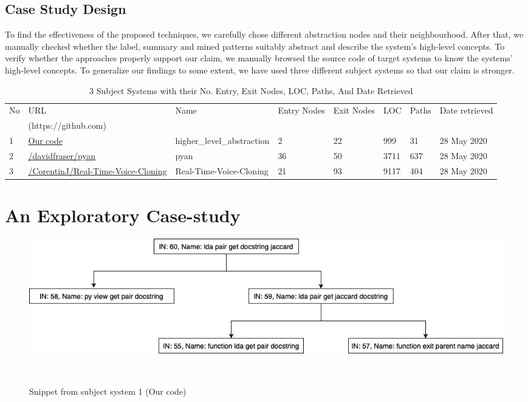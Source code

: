\subsection{Case Study Design}
To find the effectiveness of the proposed techniques, we carefully chose different abstraction nodes and their neighbourhood. After that, we manually checked whether the label, summary and mined patterns suitably abstract and describe the system's high-level concepts. To verify whether the approaches properly support our claim, we manually browsed the source code of target systems to know the systems' high-level concepts. To generalize our findings to some extent, we have used three different subject systems so that our claim is stronger.

\begin{table}%
 \caption{3 Subject Systems with their No. Entry, Exit Nodes, LOC, Paths, And Date Retrieved}
\centering
\begin{tabular}{l|l|l|l|l|l|l|l}
No & URL & Name & Entry Nodes & Exit Nodes & LOC & Paths & Date retrieved\\
 & (https://github.com) &  &  &   & & &\\
\hline
1 & \url{Our code}& higher\_level\_abstraction & 2 & 22 & 999 & 31 &  28 May 2020\\
2 & \url{/davidfraser/pyan} & pyan & 36 & 50 & 3711 & 637 & 28 May 2020\\
3 & \url{/CorentinJ/Real-Time-Voice-Cloning}& Real-Time-Voice-Cloning & 21 & 93 & 9117 & 404 & 28 May 2020\\


\end{tabular}
\label{table:subject_systems}
\end{table}

\section{An Exploratory Case-study}
\begin{figure}[tb]
  \centering
  \includegraphics[width=1\columnwidth]{figures/hla2/rq1_hla1.png}
  \caption{Snippet from subject system 1 (Our code)}~\label{fig:rq1_hla1}
\end{figure}

